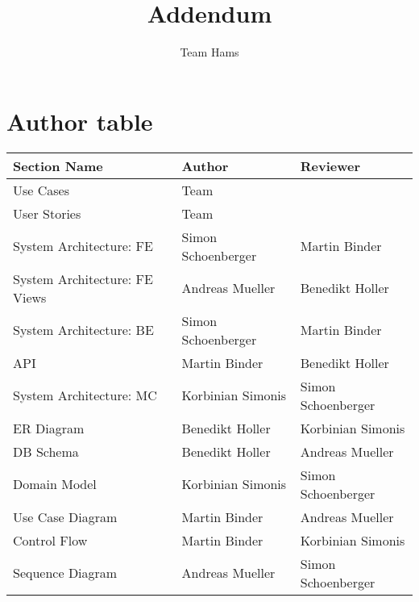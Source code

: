 \documentclass{article}
\begin{document}
\title{Addendum}
\author{Team Hams}

\maketitle

\section{Author table}

\begin{table}[!h]
	\begin{tabular}{|l|l|l|}
		\hline
		\rowcolor[HTML]{FFCCC9} 
		Section Name                  & Author             & Reviewer           \\ \hline
		Use Cases                     & Team               &                    \\ \hline
		User Stories                  & Team               &                    \\ \hline
		System Architecture: FE       & Simon Schoenberger & Martin Binder      \\ \hline
		System Architecture: FE Views & Andreas Mueller    & Benedikt Holler    \\ \hline
		System Architecture: BE       & Simon Schoenberger & Martin Binder      \\ \hline
		API                           & Martin Binder      & Benedikt Holler    \\ \hline
		System Architecture: MC       & Korbinian Simonis  & Simon Schoenberger \\ \hline
		ER Diagram                    & Benedikt Holler    & Korbinian Simonis  \\ \hline
		DB Schema                     & Benedikt Holler    & Andreas Mueller    \\ \hline
		Domain Model                  & Korbinian Simonis  & Simon Schoenberger \\ \hline
		Use Case Diagram              & Martin Binder      & Andreas Mueller    \\ \hline
		Control Flow                  & Martin Binder      & Korbinian Simonis  \\ \hline
		Sequence Diagram              & Andreas Mueller    & Simon Schoenberger \\ \hline
	\end{tabular}
\end{table}
\end{document}

